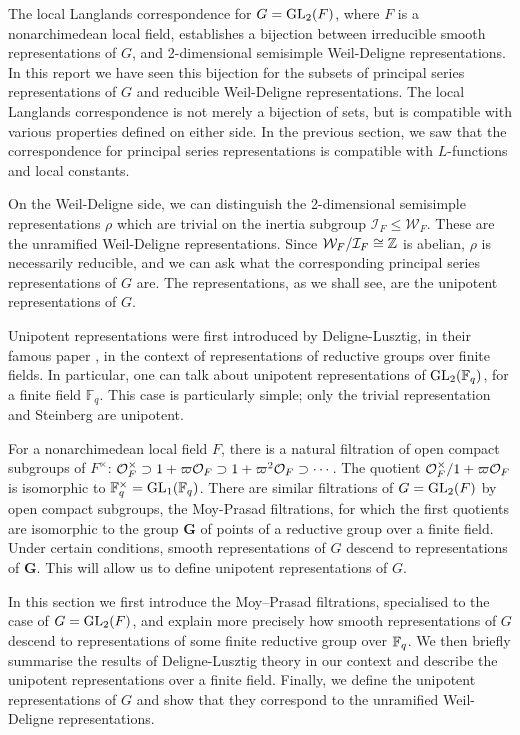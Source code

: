 The local Langlands correspondence for $G=\mathrm{GL}_2(F)$, where $F$ is a nonarchimedean local field, establishes a bijection between irreducible smooth representations of $G$, and 2-dimensional semisimple Weil-Deligne representations. In this report we have seen this bijection for the subsets of principal series representations of $G$ and reducible Weil-Deligne representations. The local Langlands correspondence is not merely a bijection of sets, but is compatible with various properties defined on either side. In the previous section, we saw that the correspondence for principal series representations is compatible with $L$-functions and local constants. 

On the Weil-Deligne side, we can distinguish the 2-dimensional semisimple representations $\rho$ which are trivial on the inertia subgroup $\mathcal I_F \leq \mathcal W_F$. These are the unramified Weil-Deligne representations. Since $\mathcal W_F/\mathcal I_F \cong \mathbb{Z}$ is abelian, $\rho$ is necessarily reducible, and we can ask what the corresponding principal series representations of $G$ are. The representations, as we shall see, are the unipotent representations of $G$.

Unipotent representations were first introduced by Deligne-Lusztig, in their famous paper \cite{DL1}, in the context of representations of reductive groups over finite fields. In particular, one can talk about unipotent representations of $\mathrm{GL}_2(\mathbb F_q)$, for a finite field $\mathbb F_q$. This case is particularly simple; only the trivial representation and Steinberg are unipotent. 

For a nonarchimedean local field $F$, there is a natural filtration of open compact subgroups of $F^\times$: $\mathcal{O}_F^\times \supset 1+\varpi\mathcal{O}_F \supset 1+\varpi^2 \mathcal{O}_F \supset \cdots$. The quotient $\mathcal{O}_F^\times/1+\varpi\mathcal{O}_F$ is isomorphic to $\mathbb F_q^\times = \mathrm{GL}_1(\mathbb{F}_q)$. There are similar filtrations of $G=\mathrm{GL}_2(F)$ by open compact subgroups, the Moy-Prasad filtrations, for which the first quotients are isomorphic to the group $\mathbf{G}$ of points of a reductive group over a finite field. Under certain conditions, smooth representations of $G$ descend to representations of $\mathbf G$. This will allow us to define unipotent representations of $G$.

In this section we first introduce the Moy--Prasad filtrations, specialised to the case of $G=\mathrm{GL}_2(F)$, and explain more precisely how smooth representations of $G$ descend to representations of some finite reductive group over $\mathbb{F}_q$. We then briefly summarise the results of Deligne-Lusztig theory in our context and describe the unipotent representations over a finite field. Finally, we define the unipotent representations of $G$ and show that they correspond to the unramified Weil-Deligne representations.

